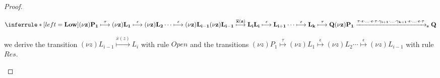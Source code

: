\begin{proposition}
\begin{proof}
\begin{description}
\begin{description}
\begin{center}
	      $\inferrule* [left=\bf{Low}]{
		  (\nu z)P_{1}\stackrel{\tau}{\longmapsto} (\nu z)L_{1}
			      \stackrel{\epsilon}{\longmapsto} (\nu z)L_{2}
		  \cdots
			      \stackrel{\epsilon}{\longmapsto} (\nu z) L_{i-1}
		\\
		(\nu z) L_{i-1} \stackrel{\overline{x}(z)}{\longmapsto} L_{i}
		\\
			      L_{i} \stackrel{\epsilon}{\longmapsto} L_{i+1}
		  \cdots 
			      \stackrel{\epsilon}{\longmapsto} L_{k}
			      \stackrel{\tau}{\longmapsto} Q
	      }{
		(\nu z)P_{1} \xrightarrow{\tau \cdot \epsilon \cdot \ldots \cdot \epsilon \cdot \tau \cdot \gamma_{i+1}\cdot \ldots \cdot \gamma_{k+1} \cdot \epsilon \cdot \ldots \cdot \epsilon \cdot \tau}_{s} Q
	      }$	  
	    \end{center}
	    we derive the transition $ (\nu z) L_{i-1} \stackrel{\overline{x}(z)}{\longmapsto} L_{i}$ with rule $Open$ and the transitions $(\nu z)P_{1}\stackrel{\tau}{\longmapsto}(\nu z)L_{1} \stackrel{\epsilon}{\longmapsto} (\nu z)L_{2}\cdots \stackrel{\epsilon}{\longmapsto} (\nu z) L_{i-1}$ with rule $Res$.
	\end{description}
    \end{description}
    

\end{proof}
\end{proposition}
